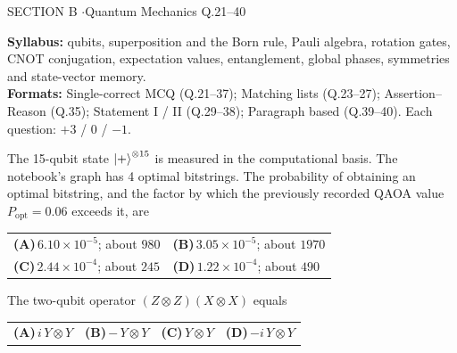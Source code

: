 \documentclass[11pt,a4paper]{article}
\newcommand{\optlabel}[1]{\textbf{(#1)}}
\newenvironment{qitem}[1]{\begin{list}{}{\setlength{\leftmargin}{3.3em}\setlength{\labelwidth}{3.1em}%
  \setlength{\labelsep}{0.2em}\setlength{\topsep}{3pt}\setlength{\parsep}{3pt}}\item[\textbf{Q.#1}\hfill]}{\end{list}}
\newcommand{\qsep}{\par\vspace{2pt}{\color{black!15}\hrule}\vspace{4pt}}
\begin{document}
\begin{sectionbanner}SECTION B \enspace$\cdot$\enspace Quantum Mechanics \hfill Q.21--40\end{sectionbanner}

{\small \textbf{Syllabus:} qubits, superposition and the Born rule, Pauli algebra, rotation gates, CNOT conjugation, expectation values, entanglement, global phases, symmetries and state-vector memory.\\ \textbf{Formats:} Single-correct MCQ (Q.21--37); Matching lists (Q.23--27); Assertion--Reason (Q.35); Statement I / II (Q.29--38); Paragraph based (Q.39--40). Each question: $+3$ / $0$ / $-1$.}
\par\medskip

\begin{qitem}{21}
The 15-qubit state $\ket{+}^{\otimes 15}$ is measured in the computational basis. The notebook's graph has 4 optimal
bitstrings. The probability of obtaining an optimal bitstring, and the factor by which the previously recorded QAOA value
$P_{\text{opt}} = 0.06$ exceeds it, are
\par\smallskip\noindent\begin{tabularx}{\linewidth}{@{}*{2}{L}@{}}
\optlabel{A}\,$6.10\times10^{-5}$; about $980$ & \optlabel{B}\,$3.05\times10^{-5}$; about $1970$ \\[3pt]
\optlabel{C}\,$2.44\times10^{-4}$; about $245$ & \optlabel{D}\,$1.22\times10^{-4}$; about $490$
\end{tabularx}
\end{qitem}
\qsep

\begin{qitem}{22}
The two-qubit operator $(Z\otimes Z)(X\otimes X)$ equals
\par\smallskip\noindent\begin{tabularx}{\linewidth}{@{}*{4}{L}@{}}
\optlabel{A}\,$i\,Y\otimes Y$ & \optlabel{B}\,$-\,Y\otimes Y$ & \optlabel{C}\,$Y\otimes Y$ & \optlabel{D}\,$-i\,Y\otimes Y$
\end{tabularx}
\end{qitem}
\qsep
\end{document}
